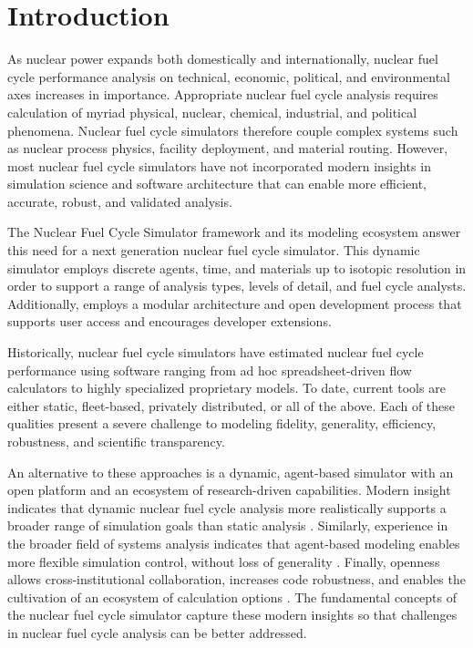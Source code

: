 
\section{Introduction}



As nuclear power expands both domestically and internationally, nuclear fuel cycle
performance analysis on technical, economic, political, and environmental axes increases 
in importance. Appropriate nuclear fuel cycle analysis requires calculation of myriad physical, nuclear, 
chemical, industrial, and political phenomena. Nuclear fuel cycle simulators 
therefore couple complex systems such as nuclear process physics, 
facility deployment, and material routing. However, most nuclear fuel cycle 
simulators have not incorporated modern insights in simulation science and 
software architecture that can enable more efficient, accurate, robust, and 
validated analysis. 

The \Cyclus Nuclear Fuel Cycle Simulator framework and 
its modeling ecosystem answer this need for a next generation nuclear fuel cycle 
simulator. This dynamic simulator employs discrete agents, time, and materials 
up to isotopic resolution in order to support a range of analysis types, levels of 
detail, and fuel cycle analysts.
Additionally, \Cyclus employs a modular architecture and 
open development process that supports user access and 
encourages developer extensions.

Historically, nuclear fuel cycle simulators have estimated 
nuclear fuel cycle performance using software 
ranging from ad hoc spreadsheet-driven flow calculators to highly specialized 
proprietary models. To date, current tools are either static, fleet-based, 
privately distributed, or all of the above. Each of these qualities present a 
severe challenge to modeling fidelity, generality, efficiency, robustness, and 
scientific transparency. 

An alternative to these approaches is a dynamic, agent-based simulator with an 
open platform and an ecosystem of research-driven capabilities.  Modern 
insight indicates that dynamic nuclear fuel cycle analysis more realistically 
supports a broader range of simulation goals than static analysis 
\cite{piet_dynamic_2011}. Similarly, experience in the broader field of systems 
analysis indicates that agent-based modeling enables more flexible simulation 
control, without loss of generality \cite{macal_agent-based_2010}. Finally, openness 
allows cross-institutional collaboration, increases code robustness, and 
enables the cultivation of an ecosystem of calculation options 
\cite{softwarecarpentryresource}.  The fundamental concepts of the \Cyclus 
nuclear fuel cycle simulator capture these modern insights so that challenges 
in nuclear fuel cycle analysis can be better addressed. 

